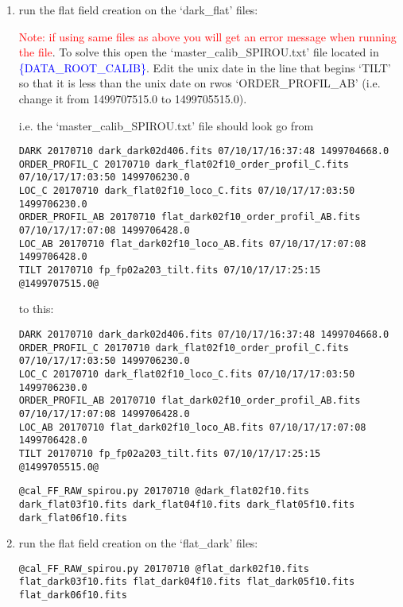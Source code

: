 \begin{enumerate}
\item run the flat field creation on the `dark\_flat' files:

\noindent \textcolor{red}{Note: if using same files as above you will get an error message when running the file}.
\noindent To solve this open the `master\_calib\_SPIROU.txt' file located in \textcolor{blue}{\{DATA\_ROOT\_CALIB\}}. Edit the unix date in the line that begins `TILT' so that it is less than the unix date on rwos `ORDER\_PROFIL\_AB' (i.e. change it from 1499707515.0 to 1499705515.0).

\noindent i.e. the `master\_calib\_SPIROU.txt' file should look go from
\begin{lstlisting}[style=text]
DARK 20170710 dark_dark02d406.fits 07/10/17/16:37:48 1499704668.0
ORDER_PROFIL_C 20170710 dark_flat02f10_order_profil_C.fits 07/10/17/17:03:50 1499706230.0
LOC_C 20170710 dark_flat02f10_loco_C.fits 07/10/17/17:03:50 1499706230.0
ORDER_PROFIL_AB 20170710 flat_dark02f10_order_profil_AB.fits 07/10/17/17:07:08 1499706428.0
LOC_AB 20170710 flat_dark02f10_loco_AB.fits 07/10/17/17:07:08 1499706428.0
TILT 20170710 fp_fp02a203_tilt.fits 07/10/17/17:25:15 @1499707515.0@
\end{lstlisting}

\noindent to this:

\begin{lstlisting}[style=text]
DARK 20170710 dark_dark02d406.fits 07/10/17/16:37:48 1499704668.0
ORDER_PROFIL_C 20170710 dark_flat02f10_order_profil_C.fits 07/10/17/17:03:50 1499706230.0
LOC_C 20170710 dark_flat02f10_loco_C.fits 07/10/17/17:03:50 1499706230.0
ORDER_PROFIL_AB 20170710 flat_dark02f10_order_profil_AB.fits 07/10/17/17:07:08 1499706428.0
LOC_AB 20170710 flat_dark02f10_loco_AB.fits 07/10/17/17:07:08 1499706428.0
TILT 20170710 fp_fp02a203_tilt.fits 07/10/17/17:25:15 @1499705515.0@

\end{lstlisting}

\begin{lstlisting}[style=bashstyle]
@cal_FF_RAW_spirou.py 20170710 @dark_flat02f10.fits dark_flat03f10.fits dark_flat04f10.fits dark_flat05f10.fits dark_flat06f10.fits
\end{lstlisting}  

\item run the flat field creation on the `flat\_dark' files:
\begin{lstlisting}[style=bashstyle]
@cal_FF_RAW_spirou.py 20170710 @flat_dark02f10.fits flat_dark03f10.fits flat_dark04f10.fits flat_dark05f10.fits flat_dark06f10.fits
\end{lstlisting}  


\end{enumerate}
